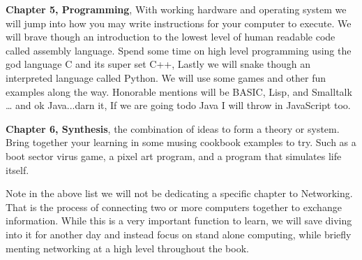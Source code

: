 \begin{flushleft}
\textbf{Chapter 5, Programming}, With working hardware and operating system we will jump into how you may write instructions for your computer to execute. We will brave though an introduction to the lowest level of human readable code called assembly language. Spend some time on high level programming using the god language C and its super set C++, Lastly we will snake though an interpreted language called Python. We will use some games and other fun examples along the way. Honorable mentions will be BASIC, Lisp, and Smalltalk … and ok Java...darn it, If we are going todo Java I will throw in JavaScript too.\newline

\textbf{Chapter 6, Synthesis}, the combination of ideas to form a theory or system. Bring together your learning in some musing cookbook examples to try. Such as a boot sector virus game, a pixel art program, and a program that simulates life itself.
\end{flushleft}

Note in the above list we will not be dedicating a specific chapter to Networking. That is the process of connecting two or more computers together to exchange information. While this is a very important function to learn, we will save diving into it for another day and instead focus on stand alone computing, while briefly menting networking at a high level throughout the book.

